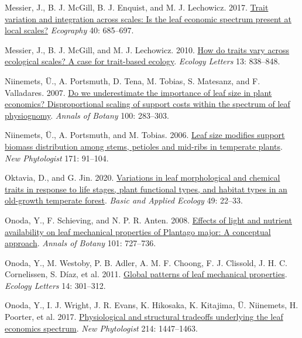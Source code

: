 \documentclass[
  12pt,
  a4paper,
,tablecaptionabove
]{scrartcl}
\newlength{\cslhangindent}
\newenvironment{CSLReferences}[2] %
 {%
  \setlength{\parindent}{0pt}
  \ifodd #1 \everypar{\setlength{\hangindent}{\cslhangindent}}\ignorespaces\fi
  \ifnum #2 > 0
  \setlength{\parskip}{#2\baselineskip}
  \fi
 }%
 {}
\begin{document}
\begin{CSLReferences}{1}{0}
\leavevmode{}%
Messier, J., B. J. McGill, B. J. Enquist, and M. J. Lechowicz. 2017. \href{https://doi.org/10.1111/ecog.02006}{Trait variation and integration across scales: Is the leaf economic spectrum present at local scales?} \emph{Ecography} 40: 685--697.

\leavevmode{}%
Messier, J., B. J. McGill, and M. J. Lechowicz. 2010. \href{https://doi.org/10.1111/j.1461-0248.2010.01476.x}{How do traits vary across ecological scales? {A} case for trait-based ecology}. \emph{Ecology Letters} 13: 838--848.

\leavevmode{}%
Niinemets, Ü., A. Portsmuth, D. Tena, M. Tobias, S. Matesanz, and F. Valladares. 2007. \href{https://doi.org/10.1093/aob/mcm107}{Do we underestimate the importance of leaf size in plant economics? {Disproportional} scaling of support costs within the spectrum of leaf physiognomy}. \emph{Annals of Botany} 100: 283--303.

\leavevmode{}%
Niinemets, Ü., A. Portsmuth, and M. Tobias. 2006. \href{https://doi.org/10.1111/j.1469-8137.2006.01741.x}{Leaf size modifies support biomass distribution among stems, petioles and mid-ribs in temperate plants}. \emph{New Phytologist} 171: 91--104.

\leavevmode{}%
Oktavia, D., and G. Jin. 2020. \href{https://doi.org/10.1016/j.baae.2020.09.010}{Variations in leaf morphological and chemical traits in response to life stages, plant functional types, and habitat types in an old-growth temperate forest}. \emph{Basic and Applied Ecology} 49: 22--33.

\leavevmode{}%
Onoda, Y., F. Schieving, and N. P. R. Anten. 2008. \href{https://doi.org/10.1093/aob/mcn013}{Effects of light and nutrient availability on leaf mechanical properties of {Plantago} major: {A} conceptual approach}. \emph{Annals of Botany} 101: 727--736.

\leavevmode{}%
Onoda, Y., M. Westoby, P. B. Adler, A. M. F. Choong, F. J. Clissold, J. H. C. Cornelissen, S. Díaz, et al. 2011. \href{https://doi.org/10.1111/j.1461-0248.2010.01582.x}{Global patterns of leaf mechanical properties}. \emph{Ecology Letters} 14: 301--312.

\leavevmode{}%
Onoda, Y., I. J. Wright, J. R. Evans, K. Hikosaka, K. Kitajima, Ü. Niinemets, H. Poorter, et al. 2017. \href{https://doi.org/10.1111/nph.14496}{Physiological and structural tradeoffs underlying the leaf economics spectrum}. \emph{New Phytologist} 214: 1447--1463.


\end{CSLReferences}
\end{document}

